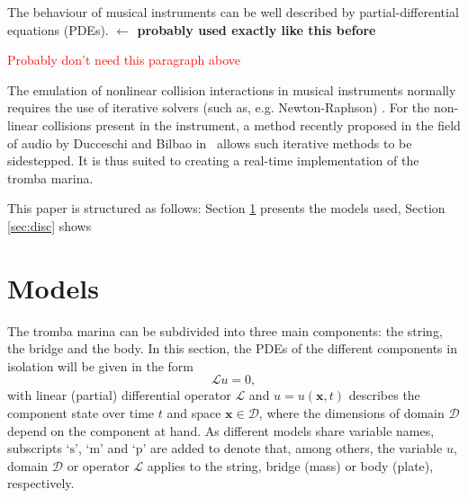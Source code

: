 \documentclass[dvipsnames, pdftex]{article}
\def\SBcomment[#1]{\textcolor{Red}{#1}}
\begin{document}
The behaviour of musical instruments can be well described by partial-differential equations (PDEs). \textbf{$\leftarrow$ probably used exactly like this before}

\SBcomment[Probably don't need this paragraph above]

The emulation of nonlinear collision interactions in musical instruments normally requires the use of iterative solvers (such as, e.g. Newton-Raphson) \cite{Bilbao15}. For the non-linear collisions present in the instrument, a method recently proposed in the field of audio by Ducceschi and Bilbao in~\cite{Ducceschi2019} allows such iterative methods to be sidestepped. It is thus suited  to creating a real-time implementation of the tromba marina.

This paper is structured as follows: Section \ref{sec:models} presents the models used, Section \ref{sec:disc} shows 

\section{Models}\label{sec:models}
The tromba marina can be subdivided into three main components: the string, the bridge and the body. In this section, the PDEs of the different components in isolation will be given in the form
\begin{equation}\label{eq:PDEform}
    \mathcal{L}u = 0,
\end{equation}
with linear (partial) differential operator $\mathcal{L}$ and $u = u(\boldsymbol{x},t)$ describes the component state over time $t$ and space $\boldsymbol{x}\in\mathcal{D}$, where the dimensions of domain $\mathcal{D}$ depend on the component at hand. As different models share variable names, subscripts `$\text{s}$', `$\text{m}$' and `$\text{p}$' are added to denote that, among others, the variable $u$, domain ${\mathcal D}$ or operator ${\mathcal L}$ applies to the string, bridge (mass) or body (plate), respectively.
\end{document}

